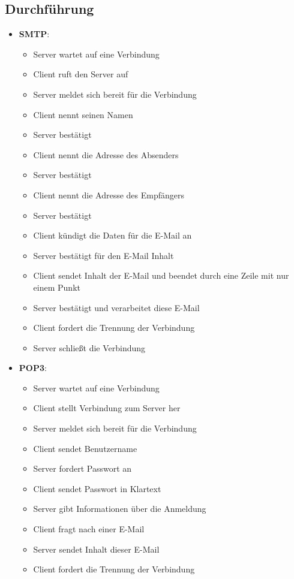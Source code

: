 \subsection{Durchführung}
\begin{itemize}
	\item \textbf{SMTP}: 
	\begin{itemize}
		\item Server wartet auf eine Verbindung
		\item Client ruft den Server auf
		\item Server meldet sich bereit für die Verbindung
		\item Client nennt seinen Namen
		\item Server bestätigt
		\item Client nennt die Adresse des Absenders
		\item Server bestätigt
		\item Client nennt die Adresse des Empfängers
		\item Server bestätigt
		\item Client kündigt die Daten für die E-Mail an
		\item Server bestätigt für den E-Mail Inhalt
		\item Client sendet Inhalt der E-Mail und beendet durch eine Zeile mit nur einem Punkt
		\item Server bestätigt und verarbeitet diese E-Mail
		\item Client fordert die Trennung der Verbindung
		\item Server schließt die Verbindung
	\end{itemize}
	\item \textbf{POP3}: 
	\begin{itemize}
		\item Server wartet auf eine Verbindung
		\item Client stellt Verbindung zum Server her
		\item Server meldet sich bereit für die Verbindung
		\item Client sendet Benutzername
		\item Server fordert Passwort an
		\item Client sendet Passwort in Klartext
		\item Server gibt Informationen über die Anmeldung
		\item Client fragt nach einer E-Mail
		\item Server sendet Inhalt dieser E-Mail
		\item Client fordert die Trennung der Verbindung

\end{itemize}
\end{itemize}
